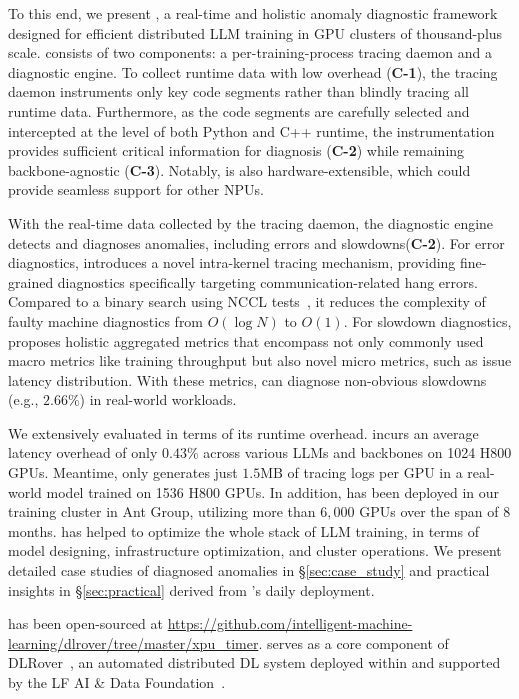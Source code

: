 To this end, we present \sysname{}, a real-time and holistic anomaly diagnostic framework designed for efficient distributed LLM training in GPU clusters of thousand-plus scale.
\sysname{} consists of two components: a per-training-process tracing daemon and a diagnostic engine.
To collect runtime data with low overhead (\textbf{C-1}), the tracing daemon instruments only key code segments rather than blindly tracing all runtime data.
Furthermore, as the code segments are carefully selected and intercepted at the level of both Python and C++ runtime, the instrumentation provides sufficient critical information for diagnosis (\textbf{C-2}) while remaining backbone-agnostic (\textbf{C-3}).
Notably, \sysname{} is also hardware-extensible, which could provide seamless support for other NPUs.

With the real-time data collected by the tracing daemon, the diagnostic engine detects and diagnoses anomalies, including errors and slowdowns(\textbf{C-2}).
For error diagnostics, \sysname{} introduces a novel intra-kernel tracing mechanism, providing fine-grained diagnostics specifically targeting communication-related hang errors.
Compared to a binary search using NCCL tests~\cite{nccl2024,jiangMegaScaleScaling}, it reduces the complexity of faulty machine diagnostics from $O(\log N)$ to $O(1)$.
For slowdown diagnostics, \sysname{} proposes holistic aggregated metrics that encompass not only commonly used macro metrics like training throughput but also novel micro metrics, such as issue latency distribution.
With these metrics, \sysname{} can diagnose non-obvious slowdowns (e.g., $2.66\%$) in real-world workloads.

We extensively evaluated \sysname{} in terms of its runtime overhead. \sysname{} incurs an average latency overhead of only $0.43\%$ across various LLMs and backbones on 1024 H800 GPUs. Meantime, \sysname{} only generates just $1.5\text{MB}$ of tracing logs per GPU in a real-world model trained on 1536 H800 GPUs. In addition, \sysname{} has been deployed in our training cluster in Ant Group\cite{antgroup}, utilizing more than $6,000$ GPUs over the span of 8 months.
\sysname{} has helped to optimize the whole stack of LLM training, in terms of model designing, infrastructure optimization, and cluster operations.
We present detailed case studies of diagnosed anomalies in \S\ref{sec:case_study} and practical insights in \S\ref{sec:practical} derived from \sysname{}’s daily deployment.



\sysname{} has been open-sourced at \url{https://github.com/intelligent-machine-learning/dlrover/tree/master/xpu_timer}.
\sysname{} serves as a core component of DLRover~\cite{dlrover}, an automated distributed DL system deployed within \groupname{} and supported by the LF AI \& Data Foundation~\cite{lfaidata}. 

